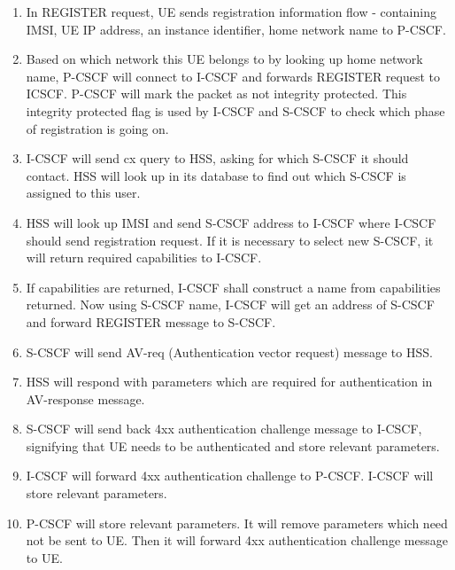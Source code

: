 \documentclass[hidelinks]{report}
\begin{document}
\begin{enumerate}
\item In REGISTER request, UE sends registration information flow - containing IMSI, UE IP address, an instance identifier, home network name to P-CSCF. 
\item Based on which network this UE belongs to by looking up home network name, P-CSCF will connect to I-CSCF and forwards REGISTER request to ICSCF. P-CSCF will mark the packet as not integrity protected. This integrity protected flag is used by I-CSCF and S-CSCF to check which phase of registration is going on. 
\item I-CSCF will send cx query to HSS, asking for which S-CSCF it should contact. HSS will look up in its database to find out which S-CSCF is assigned to this user. 
\item HSS will look up IMSI and send S-CSCF address to I-CSCF where I-CSCF should send registration request. If it is necessary to select new S-CSCF, it will return required capabilities to I-CSCF.
\item If capabilities are returned, I-CSCF shall construct a name from capabilities returned. Now using S-CSCF name, I-CSCF will get an address of S-CSCF and forward REGISTER message to S-CSCF.
\item S-CSCF will send AV-req (Authentication vector request) message to HSS. 
\item HSS will respond with parameters which are required for authentication in AV-response message.
\item S-CSCF will send back 4xx authentication challenge message to I-CSCF, signifying that UE needs to be authenticated and store relevant parameters.
\item I-CSCF will forward 4xx authentication challenge to P-CSCF. I-CSCF will store relevant parameters. 
\item P-CSCF will store relevant parameters. It will remove parameters which need not be sent to UE. Then it will forward 4xx authentication challenge message to UE.
\end{enumerate}
\end{document}
